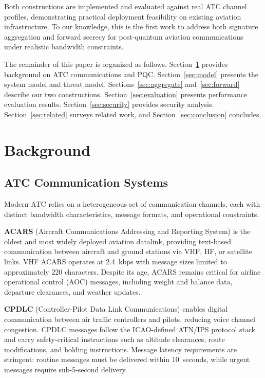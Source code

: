 \documentclass[conference,10pt]{IEEEtran}
\begin{document}
Both constructions are implemented and evaluated against real ATC channel profiles, demonstrating practical deployment feasibility on existing aviation infrastructure. To our knowledge, this is the first work to address both signature aggregation and forward secrecy for post-quantum aviation communications under realistic bandwidth constraints.

The remainder of this paper is organized as follows. Section~\ref{sec:background} provides background on ATC communications and PQC. Section~\ref{sec:model} presents the system model and threat model. Sections~\ref{sec:aggregate} and~\ref{sec:forward} describe our two constructions. Section~\ref{sec:evaluation} presents performance evaluation results. Section~\ref{sec:security} provides security analysis. Section~\ref{sec:related} surveys related work, and Section~\ref{sec:conclusion} concludes.

\section{Background}
\label{sec:background}

\subsection{ATC Communication Systems}

Modern ATC relies on a heterogeneous set of communication channels, each with distinct bandwidth characteristics, message formats, and operational constraints.

\textbf{ACARS} (Aircraft Communications Addressing and Reporting System) is the oldest and most widely deployed aviation datalink, providing text-based communication between aircraft and ground stations via VHF, HF, or satellite links. VHF ACARS operates at 2.4~kbps with message sizes limited to approximately 220 characters. Despite its age, ACARS remains critical for airline operational control (AOC) messages, including weight and balance data, departure clearances, and weather updates.

\textbf{CPDLC} (Controller-Pilot Data Link Communications) enables digital communication between air traffic controllers and pilots, reducing voice channel congestion. CPDLC messages follow the ICAO-defined ATN/IPS protocol stack~\cite{icao9896} and carry safety-critical instructions such as altitude clearances, route modifications, and holding instructions. Message latency requirements are stringent: routine messages must be delivered within 10~seconds, while urgent messages require sub-5-second delivery.
\end{document}
